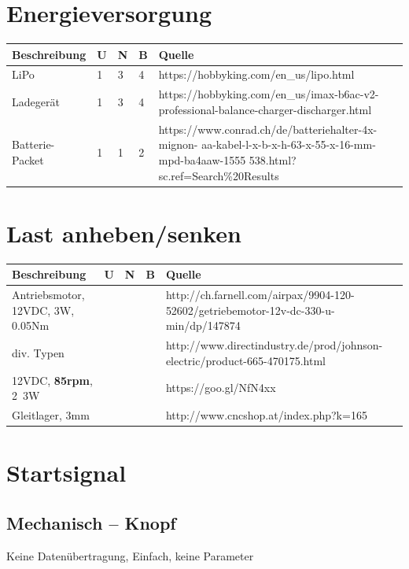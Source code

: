 \documentclass[a4paper]{report}
\begin{document}
\section{Energieversorgung}
\vspace{1em}
\noindent
\begin{tabular}{|p{}|p{}|p{}|p{}|p{}|}
	\hline
	\textbf{Beschreibung} & \textbf{U} & \textbf{N} & \textbf{B} & \textbf{Quelle} \\
	\hline
	LiPo & 1 & 3 & 4 & https://hobbyking.com/en\_us/lipo.html \\
	\hline
	Ladegerät & 1 & 3 & 4 & https://hobbyking.com/en\_us/imax-b6ac-v2-professional-balance-charger-discharger.html \\
	\hline
	Batterie-Packet & 1 & 1 & 2 & https://www.conrad.ch/de/batteriehalter-4x-mignon-
	aa-kabel-l-x-b-x-h-63-x-55-x-16-mm-mpd-ba4aaw-1555
	538.html?sc.ref=Search\%20Results
	\\
	\hline
\end{tabular}

\section{Last anheben/senken}
\begin{tabular}{|p{}|p{}|p{}|p{}|p{}|}
	\hline
	\textbf{Beschreibung} & \textbf{U} & \textbf{N} & \textbf{B} & \textbf{Quelle} \\
	\hline
	Antriebsmotor, 12VDC, 3W, 0.05Nm & & & &
	http://ch.farnell.com/airpax/9904-120-52602/getriebemotor-12v-dc-330-u-min/dp/147874  \\
	\hline
	div. Typen & & & & http://www.directindustry.de/prod/johnson-electric/product-665-470175.html\\
	\hline
	12VDC, \textbf{85rpm}, 2~3W & & & & https://goo.gl/NfN4xx\\
	\hline
	Gleitlager, 3mm & & & & http://www.cncshop.at/index.php?k=165\\
	\hline
\end{tabular}

\section{Startsignal}
\subsection{Mechanisch – Knopf}
Keine Datenübertragung, Einfach, keine Parameter
\end{document}

